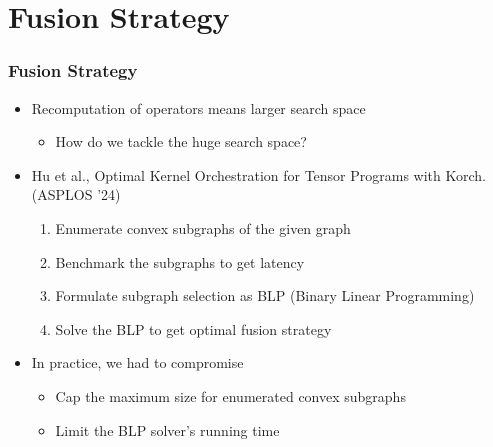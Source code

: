 \section{Fusion Strategy}
\begin{frame}
\frametitle{Fusion Strategy}

\begin{itemize}
  \item Recomputation of operators means larger search space
  \begin{itemize}
	\item How do we tackle the huge search space?
  \end{itemize}
  \pause
  \item Hu et al., Optimal Kernel Orchestration for Tensor Programs with Korch. (ASPLOS '24)
  \begin{enumerate}
    \item Enumerate convex subgraphs of the given graph
    \item Benchmark the subgraphs to get latency
    \item Formulate subgraph selection as BLP (Binary Linear Programming)
    \item Solve the BLP to get optimal fusion strategy
  \end{enumerate}
  \pause
  \item In practice, we had to compromise
  \begin{itemize}
    \item Cap the maximum size for enumerated convex subgraphs
	\item Limit the BLP solver's running time
  \end{itemize}
\end{itemize}
\end{frame}
